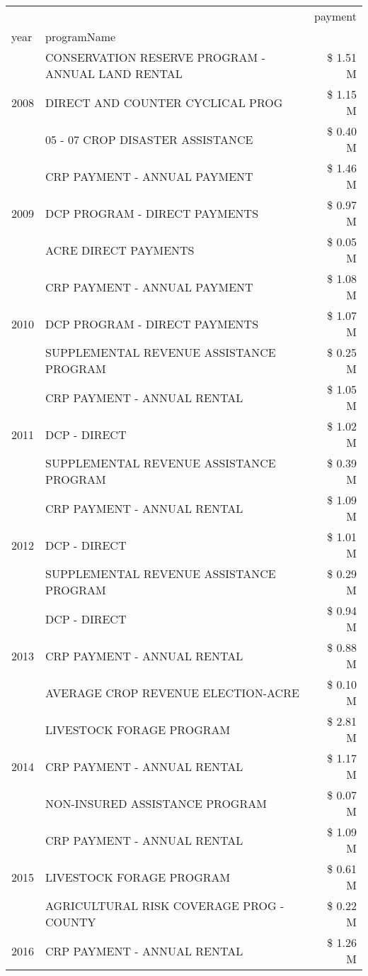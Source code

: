 \begin{tabular}{llr}
\toprule
 &  & payment \\
year & programName &  \\
\midrule
\multirow[t]{3}{*}{2008} & CONSERVATION RESERVE PROGRAM - ANNUAL LAND RENTAL & \$ 1.51 M \\
 & DIRECT AND COUNTER CYCLICAL PROG & \$ 1.15 M \\
 & 05 - 07 CROP DISASTER ASSISTANCE & \$ 0.40 M \\
\cline{1-3}
\multirow[t]{3}{*}{2009} & CRP PAYMENT - ANNUAL PAYMENT & \$ 1.46 M \\
 & DCP PROGRAM - DIRECT PAYMENTS & \$ 0.97 M \\
 & ACRE DIRECT PAYMENTS & \$ 0.05 M \\
\cline{1-3}
\multirow[t]{3}{*}{2010} & CRP PAYMENT - ANNUAL PAYMENT & \$ 1.08 M \\
 & DCP PROGRAM - DIRECT PAYMENTS & \$ 1.07 M \\
 & SUPPLEMENTAL REVENUE ASSISTANCE PROGRAM & \$ 0.25 M \\
\cline{1-3}
\multirow[t]{3}{*}{2011} & CRP PAYMENT - ANNUAL RENTAL & \$ 1.05 M \\
 & DCP - DIRECT & \$ 1.02 M \\
 & SUPPLEMENTAL REVENUE ASSISTANCE PROGRAM & \$ 0.39 M \\
\cline{1-3}
\multirow[t]{3}{*}{2012} & CRP PAYMENT - ANNUAL RENTAL & \$ 1.09 M \\
 & DCP - DIRECT & \$ 1.01 M \\
 & SUPPLEMENTAL REVENUE ASSISTANCE PROGRAM & \$ 0.29 M \\
\cline{1-3}
\multirow[t]{3}{*}{2013} & DCP - DIRECT & \$ 0.94 M \\
 & CRP PAYMENT - ANNUAL RENTAL & \$ 0.88 M \\
 & AVERAGE CROP REVENUE ELECTION-ACRE & \$ 0.10 M \\
\cline{1-3}
\multirow[t]{3}{*}{2014} & LIVESTOCK FORAGE PROGRAM & \$ 2.81 M \\
 & CRP PAYMENT - ANNUAL RENTAL & \$ 1.17 M \\
 & NON-INSURED ASSISTANCE PROGRAM & \$ 0.07 M \\
\cline{1-3}
\multirow[t]{3}{*}{2015} & CRP PAYMENT - ANNUAL RENTAL & \$ 1.09 M \\
 & LIVESTOCK FORAGE PROGRAM & \$ 0.61 M \\
 & AGRICULTURAL RISK COVERAGE PROG - COUNTY & \$ 0.22 M \\
\cline{1-3}
\multirow[t]{3}{*}{2016} & CRP PAYMENT - ANNUAL RENTAL & \$ 1.26 M \\

\end{tabular}
